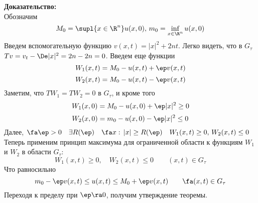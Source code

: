 \documentclass[a4paper,draft]{article}
\begin{document}
\noindent\textbf{Доказательство:}\\
Обозначим
$$
M_0=\supl{x \in \R^n} u(x,0),\,m_0=\inf_{x \in \R^n}
u(x,0)
$$
Введем вспомогательную функцию $v(x,t)=|x|^2+2nt$. Легко видеть,
что в $G_\tau$ $Tv=v_t-\De |x|^2=2n-2n=0$. Введем еще функции
$$
W_1(x,t)=M_0-u(x,t)+\ep v(x,t)
$$
$$
W_2(x,t)=M_0-u(x,t)-\ep v(x,t)
$$
Заметим, что $TW_1=TW_2=0$ в $G_\tau$, и кроме того
$$
W_1(x,0)=M_0-u(x,0)+\ep |x|^2\ge 0
$$
$$
W_2(x,0)=m_0-u(x,0)-\ep |x|^2\le 0
$$
Далее, $\fa \ep>0\quad \exists R(\ep)\quad
\fa x:\, |x|\ge R(\ep)\quad W_1(x,t)\ge
0,\,W_2(x,t)\le 0 $ Теперь применим принцип максимума для
ограниченной области  к функциям $W_1$ и $W_2$ в области $G_\tau$:
$$
W_1(x,t)\ge 0,\quad W_2(x,t)\le 0\qquad (x,t)\in G_\tau
$$
Что равносильно
$$
m_0-\ep v(x,t)\le u(x,t) \le M_0+\ep v(x,t)
\qquad \fa(x,t)\in G_\tau
$$
Переходя к пределу при $\ep\ra 0$, получим
утверждение теоремы.\\
\end{document}
